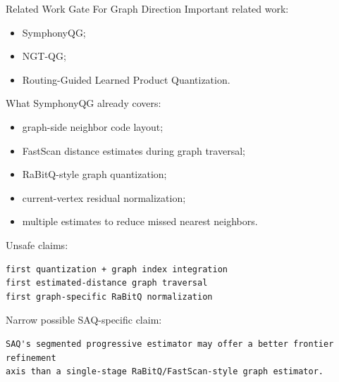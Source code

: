 \documentclass[aspectratio=169,10pt]{beamer}
\begin{document}
\begin{frame}[fragile]{Related Work Gate For Graph Direction}
\small
Important related work:
\begin{itemize}
  \item SymphonyQG;
  \item NGT-QG;
  \item Routing-Guided Learned Product Quantization.
\end{itemize}

What SymphonyQG already covers:
\begin{itemize}
  \item graph-side neighbor code layout;
  \item FastScan distance estimates during graph traversal;
  \item RaBitQ-style graph quantization;
  \item current-vertex residual normalization;
  \item multiple estimates to reduce missed nearest neighbors.
\end{itemize}

Unsafe claims:
\begin{lstlisting}
first quantization + graph index integration
first estimated-distance graph traversal
first graph-specific RaBitQ normalization
\end{lstlisting}

Narrow possible SAQ-specific claim:
\begin{lstlisting}
SAQ's segmented progressive estimator may offer a better frontier refinement
axis than a single-stage RaBitQ/FastScan-style graph estimator.
\end{lstlisting}
\end{frame}
\end{document}
